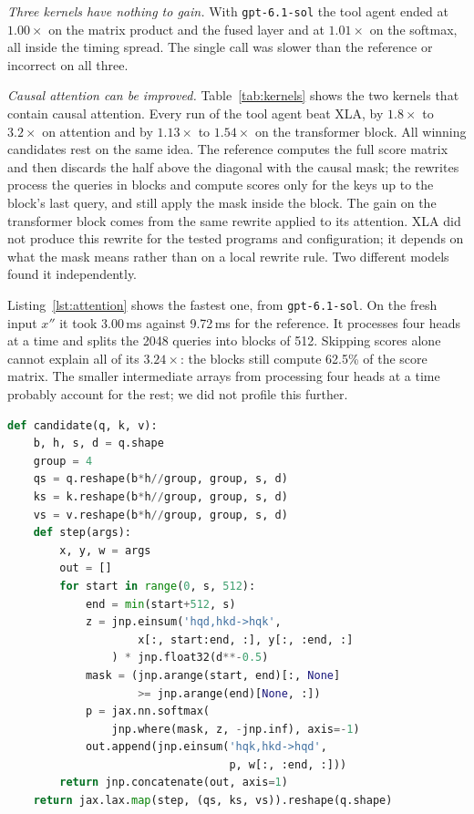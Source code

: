 \documentclass[conference]{IEEEtran}
\begin{document}
\emph{Three kernels have nothing to gain.} With \texttt{gpt-6.1-sol} the
tool agent ended at $1.00\times$ on the matrix product and the fused layer
and at $1.01\times$ on the softmax, all inside the timing spread. The single
call was slower than the reference or incorrect on all three.

\emph{Causal attention can be improved.} Table~\ref{tab:kernels} shows the
two kernels that contain causal attention. Every run of the tool agent beat
XLA, by $1.8\times$ to $3.2\times$ on attention and by $1.13\times$ to
$1.54\times$ on the transformer block. All winning candidates rest on the
same idea. The reference computes the full score matrix and then discards
the half above the diagonal with the causal mask; the rewrites process the
queries in blocks and compute scores only for the keys up to the block's
last query, and still apply the mask inside the block. The gain on the
transformer block comes from the same rewrite applied to its attention. XLA
did not produce this rewrite for the tested programs and configuration; it
depends on what the mask means rather than on a local rewrite rule. Two
different models found it independently.

Listing~\ref{lst:attention} shows the fastest one, from \texttt{gpt-6.1-sol}.
On the fresh input $x''$ it took 3.00\,ms against 9.72\,ms for the reference.
It processes four heads at a time and splits the 2048 queries into blocks of
512. Skipping scores alone cannot explain all of its $3.24\times$: the
blocks still compute 62.5\% of the score matrix. The smaller intermediate
arrays from processing four heads at a time probably account for the rest;
we did not profile this further.

\begin{lstlisting}[float=t, language=Python, basicstyle=\scriptsize\ttfamily,
  label=lst:attention, caption={The fastest attention rewrite
  ($3.24\times$, \texttt{gpt-6.1-sol}), with whitespace adjusted. \texttt{q},
  \texttt{k} and \texttt{v} have shape (batch, heads, sequence, head width).}]
def candidate(q, k, v):
    b, h, s, d = q.shape
    group = 4
    qs = q.reshape(b*h//group, group, s, d)
    ks = k.reshape(b*h//group, group, s, d)
    vs = v.reshape(b*h//group, group, s, d)
    def step(args):
        x, y, w = args
        out = []
        for start in range(0, s, 512):
            end = min(start+512, s)
            z = jnp.einsum('hqd,hkd->hqk',
                    x[:, start:end, :], y[:, :end, :]
                ) * jnp.float32(d**-0.5)
            mask = (jnp.arange(start, end)[:, None]
                    >= jnp.arange(end)[None, :])
            p = jax.nn.softmax(
                jnp.where(mask, z, -jnp.inf), axis=-1)
            out.append(jnp.einsum('hqk,hkd->hqd',
                                  p, w[:, :end, :]))
        return jnp.concatenate(out, axis=1)
    return jax.lax.map(step, (qs, ks, vs)).reshape(q.shape)
\end{lstlisting}
\end{document}
